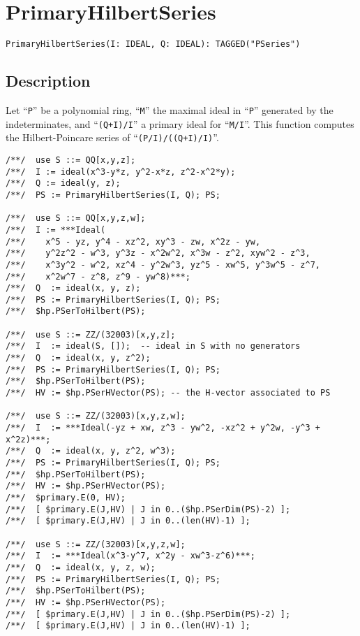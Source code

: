 \documentclass[a4paper]{mybook}
\newenvironment{command}{}{} %
\begin{document}
\section{PrimaryHilbertSeries}
\label{PrimaryHilbertSeries}
\begin{command} %


\begin{Verbatim}[label=syntax, rulecolor=\color{MidnightBlue},
frame=single]
PrimaryHilbertSeries(I: IDEAL, Q: IDEAL): TAGGED("PSeries")
\end{Verbatim}


\subsection*{Description}

Let ``\verb&P&'' be a polynomial ring,
``\verb&M&'' the maximal ideal in ``\verb&P&'' generated by the indeterminates,
and ``\verb&(Q+I)/I&'' a primary ideal for ``\verb&M/I&''.
This function computes the Hilbert-Poincare series of ``\verb&(P/I)/((Q+I)/I)&''.
\begin{Verbatim}[label=example, rulecolor=\color{PineGreen}, frame=single]
/**/  use S ::= QQ[x,y,z];
/**/  I := ideal(x^3-y*z, y^2-x*z, z^2-x^2*y);
/**/  Q := ideal(y, z);
/**/  PS := PrimaryHilbertSeries(I, Q); PS;

/**/  use S ::= QQ[x,y,z,w];
/**/  I := ***Ideal(
/**/    x^5 - yz, y^4 - xz^2, xy^3 - zw, x^2z - yw,
/**/    y^2z^2 - w^3, y^3z - x^2w^2, x^3w - z^2, xyw^2 - z^3,
/**/    x^3y^2 - w^2, xz^4 - y^2w^3, yz^5 - xw^5, y^3w^5 - z^7,
/**/    x^2w^7 - z^8, z^9 - yw^8)***;
/**/  Q  := ideal(x, y, z);
/**/  PS := PrimaryHilbertSeries(I, Q); PS;
/**/  $hp.PSerToHilbert(PS);

/**/  use S ::= ZZ/(32003)[x,y,z];
/**/  I  := ideal(S, []);  -- ideal in S with no generators
/**/  Q  := ideal(x, y, z^2);
/**/  PS := PrimaryHilbertSeries(I, Q); PS;
/**/  $hp.PSerToHilbert(PS);
/**/  HV := $hp.PSerHVector(PS); -- the H-vector associated to PS

/**/  use S ::= ZZ/(32003)[x,y,z,w];
/**/  I  := ***Ideal(-yz + xw, z^3 - yw^2, -xz^2 + y^2w, -y^3 + x^2z)***;
/**/  Q  := ideal(x, y, z^2, w^3);
/**/  PS := PrimaryHilbertSeries(I, Q); PS;
/**/  $hp.PSerToHilbert(PS);
/**/  HV := $hp.PSerHVector(PS);
/**/  $primary.E(0, HV);
/**/  [ $primary.E(J,HV) | J in 0..($hp.PSerDim(PS)-2) ];
/**/  [ $primary.E(J,HV) | J in 0..(len(HV)-1) ];

/**/  use S ::= ZZ/(32003)[x,y,z,w];
/**/  I  := ***Ideal(x^3-y^7, x^2y - xw^3-z^6)***;
/**/  Q  := ideal(x, y, z, w);
/**/  PS := PrimaryHilbertSeries(I, Q); PS;
/**/  $hp.PSerToHilbert(PS);
/**/  HV := $hp.PSerHVector(PS);
/**/  [ $primary.E(J,HV) | J in 0..($hp.PSerDim(PS)-2) ];
/**/  [ $primary.E(J,HV) | J in 0..(len(HV)-1) ];


\end{Verbatim}
\end{command}
\end{document}
